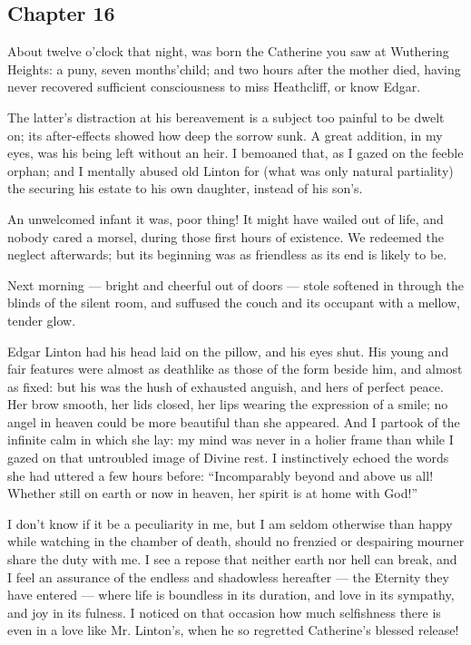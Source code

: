 \subsection*{Chapter 16}

\par About twelve o'clock that night, was born the Catherine you saw at Wuthering Heights: a puny, seven months'child; and two hours after the mother died, having never recovered sufficient consciousness to miss Heathcliff, or know Edgar.
\par The latter's distraction at his bereavement is a subject too painful to be dwelt on; its after-effects showed how deep the sorrow sunk. A great addition, in my eyes, was his being left without an heir. I bemoaned that, as I gazed on the feeble orphan; and I mentally abused old Linton for (what was only natural partiality) the securing his estate to his own daughter, instead of his son's.
\par An unwelcomed infant it was, poor thing! It might have wailed out of life, and nobody cared a morsel, during those first hours of existence. We redeemed the neglect afterwards; but its beginning was as friendless as its end is likely to be.
\par Next morning — bright and cheerful out of doors — stole softened in through the blinds of the silent room, and suffused the couch and its occupant with a mellow, tender glow.
\par Edgar Linton had his head laid on the pillow, and his eyes shut. His young and fair features were almost as deathlike as those of the form beside him, and almost as fixed: but his was the hush of exhausted anguish, and hers of perfect peace. Her brow smooth, her lids closed, her lips wearing the expression of a smile; no angel in heaven could be more beautiful than she appeared. And I partook of the infinite calm in which she lay: my mind was never in a holier frame than while I gazed on that untroubled image of Divine rest. I instinctively echoed the words she had uttered a few hours before: “Incomparably beyond and above us all! Whether still on earth or now in heaven, her spirit is at home with God!”
\par I don't know if it be a peculiarity in me, but I am seldom otherwise than happy while watching in the chamber of death, should no frenzied or despairing mourner share the duty with me. I see a repose that neither earth nor hell can break, and I feel an assurance of the endless and shadowless hereafter — the Eternity they have entered — where life is boundless in its duration, and love in its sympathy, and joy in its fulness. I noticed on that occasion how much selfishness there is even in a love like Mr. Linton's, when he so regretted Catherine's blessed release!
